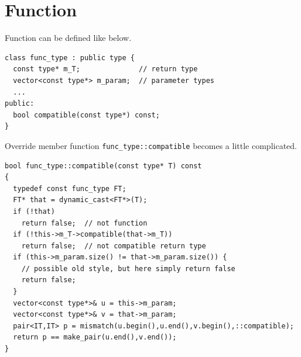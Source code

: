 \section{Function}

Function can be defined like below.
\begin{verbatim}
class func_type : public type {
  const type* m_T;              // return type
  vector<const type*> m_param;  // parameter types
  ...
public:
  bool compatible(const type*) const;
}
\end{verbatim}

Override member function {\tt{func\_type::compatible}}
becomes a little complicated.

\begin{verbatim}
bool func_type::compatible(const type* T) const
{
  typedef const func_type FT;
  FT* that = dynamic_cast<FT*>(T);
  if (!that)
    return false;  // not function
  if (!this->m_T->compatible(that->m_T))
    return false;  // not compatible return type
  if (this->m_param.size() != that->m_param.size()) {
    // possible old style, but here simply return false
    return false;
  }
  vector<const type*>& u = this->m_param;
  vector<const type*>& v = that->m_param;
  pair<IT,IT> p = mismatch(u.begin(),u.end(),v.begin(),::compatible);
  return p == make_pair(u.end(),v.end());
}
\end{verbatim}

